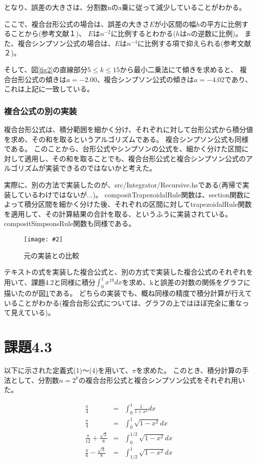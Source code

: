 \documentclass[11pt]{jsarticle}
\newcommand{\fg}[3]{ %
    \begin{figure}
        \centering
        \texttt{[image: \#2]}
        \caption{#3}
        \label{#1}
    \end{figure}
}
\newcommand{\fr}[1]{図\ref{#1}}
\begin{document}
となり、誤差の大きさは、分割数nのa乗に従って減少していることがわかる。

ここで、複合台形公式の場合は、誤差の大きさ$E$が小区間の幅$h$の平方に比例することから(参考文献１)、
$E$は$n^{-2}$に比例するとわかる($h$は$n$の逆数に比例)。
また、複合シンプソン公式の場合は、$E$は$n^{-4}$に比例する項で抑えられる(参考文献２)。

そして、\fr{fig2}の直線部分$5 \leq k \leq 15$から最小二乗法にて傾きを求めると、
複合台形公式の傾きは$a = -2.00$、複合シンプソン公式の傾きは$a = -4.02$であり、
これは上記に一致している。

\subsubsection{複合公式の別の実装}
複合台形公式は、積分範囲を細かく分け、それぞれに対して台形公式から積分値を求め、その和を取るというアルゴリズムである。
複合シンプソン公式も同様である。
このことから、台形公式やシンプソンの公式を、細かく分けた区間に対して適用し、その和を取ることでも、複合台形公式と複合シンプソン公式のアルゴリズムが実装できるのではないかと考えた。

実際に、別の方法で実装したのが、src/Integrator/Recursive.hsである(再帰で実装しているわけではないが...)。
compositTrapezoidalRule関数は、section関数によって積分区間を細かく分けた後、それぞれの区間に対してtrapezoidalRule関数を適用して、その計算結果の合計を取る、というふうに実装されている。
compositSimpsonsRule関数も同様である。

\fg{fig5}{graph/4_2_extra.png}{元の実装との比較}
テキストの式を実装した複合公式と、別の方式で実装した複合公式のそれぞれを用いて、課題4.2と同様に積分$ \int^{1}_{0} x^{19} dx $を求め、kと誤差の対数の関係をグラフに描いたのが\fr{fig5}である。
どちらの実装でも、概ね同様の精度で積分計算が行えていることがわかる(複合台形公式については、グラフの上ではほぼ完全に重なって見えている)。

\section{課題4.3}
以下に示された定義式(1)〜(4)を用いて、$\pi$を求めた。
このとき、積分計算の手法として、分割数$n = 2^k$の複合台形公式と複合シンプソン公式をそれぞれ用いた。

\begin{eqnarray}
    \frac{\pi}{4} & = & \int^{1}_{0}\frac{1}{1+x^2}dx \\
    \frac{\pi}{4} & = & \int^{1}_{0}\sqrt{1 - x^2}dx \\
    \frac{\pi}{12}+\frac{\sqrt 3}{8} & = & \int^{1/2}_{0} \sqrt{1 - x^2} dx \\
    \frac{\pi}{6}-\frac{\sqrt 3}{8} & = & \int^{1}_{1/2} \sqrt{1 - x^2} dx
\end{eqnarray}
\end{document}
